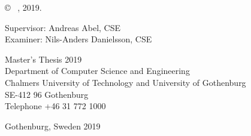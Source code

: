 \copyright ~ \me, 2019. \vspace{1cm}

Supervisor: Andreas Abel, CSE\\
Examiner: Nils-Anders Danielsson, CSE
\vspace{1cm}

Master's Thesis 2019\\	%
Department of Computer Science and Engineering\\
Chalmers University of Technology and University of Gothenburg\\
SE-412 96 Gothenburg\\
Telephone +46 31 772 1000 \vspace{0.5cm}

\vfill

Gothenburg, Sweden 2019
